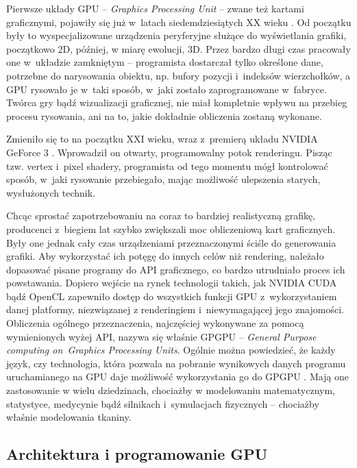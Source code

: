 		Pierwsze układy GPU -- \emph{Graphics Processing Unit} -- zwane też kartami graficznymi, pojawiły się już w~latach siedemdziesiątych XX wieku \cite{gpu_wiki}. Od początku były to wyspecjalizowane urządzenia peryferyjne służące do wyświetlania grafiki, początkowo 2D, później, w miarę ewolucji, 3D. Przez bardzo długi czas pracowały one w~układzie zamkniętym -- programista dostarczał tylko określone dane, potrzebne do narysowania obiektu, np. bufory pozycji i~indeksów wierzchołków, a GPU rysowało je w~taki sposób, w~jaki zostało zaprogramowane w~fabryce. Twórca gry bądź wizualizacji graficznej, nie miał kompletnie wpływu na przebieg procesu rysowania, ani na to, jakie dokładnie obliczenia zostaną wykonane. 
		
		Zmieniło się to na początku XXI wieku, wraz z~premierą układu NVIDIA GeForce 3 \cite{gpu_wiki}. Wprowadził on otwarty, programowalny potok renderingu. Pisząc tzw. vertex i~pixel shadery, programista od tego momentu mógł kontrolować sposób, w~jaki rysowanie przebiegało, mając możliwość ulepszenia starych, wysłużonych technik. 
		
		Chcąc sprostać zapotrzebowaniu na coraz to bardziej realistyczną grafikę, producenci z~biegiem lat szybko zwiększali moc obliczeniową kart graficznych. Były one jednak cały czas urządzeniami przeznaczonymi ściśle do generowania grafiki. Aby wykorzystać ich potęgę do innych celów niż rendering, należało dopasować pisane programy do API graficznego, co bardzo utrudniało proces ich powstawania. Dopiero wejście na rynek technologii takich, jak NVIDIA CUDA bądź OpenCL zapewniło dostęp do wszystkich funkcji GPU z~wykorzystaniem danej platformy, niezwiązanej z renderingiem i~niewymagającej jego znajomości. Obliczenia ogólnego przeznaczenia, najczęściej wykonywane za pomocą wymienionych wyżej API, nazywa się właśnie GPGPU -- \emph{General Purpose computing on~Graphics Processing Units}. Ogólnie można powiedzieć, że każdy język, czy technologia, która pozwala na pobranie wynikowych danych programu uruchamianego na GPU daje możliwość wykorzystania go do GPGPU \cite{gpu_wiki}. Mają one zastosowanie w wielu dziedzinach, chociażby w modelowaniu matematycznym, statystyce, medycynie bądź silnikach i~symulacjach fizycznych -- chociażby właśnie modelowania tkaniny. 
	
		\subsection{Architektura i programowanie GPU}
		\label{t:teoria:gpu:architektura}
		
